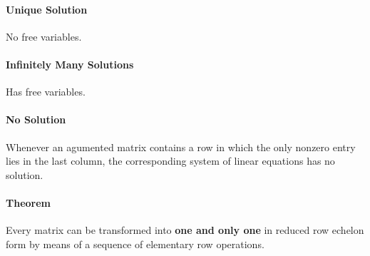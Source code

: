 \documentclass[14pt]{article}
\begin{document}
\begin{CJK}{UTF8}{min}
\paragraph{Unique Solution}
No free variables.
\paragraph{Infinitely Many Solutions}
Has free variables.
\paragraph{No Solution}
Whenever an agumented matrix contains a row in which the only nonzero entry lies in the last column, the corresponding system of linear equations has no solution.
\paragraph{Theorem}
Every matrix can be transformed into \textbf{one and only one} in reduced row echelon form by means of a sequence of elementary row operations.


\end{CJK}
\end{document}
